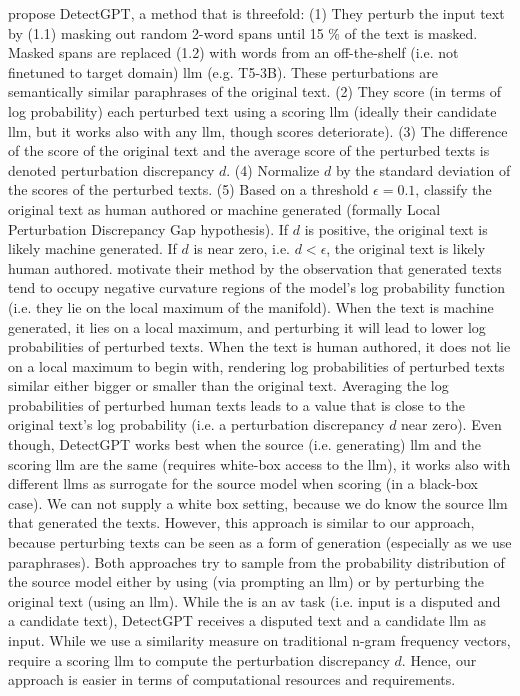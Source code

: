 \citet{mitchell_detectgpt_2023} propose DetectGPT, a method that is threefold:
(1) They perturb the input text by (1.1) masking out random 2-word spans until 15 \% of the text is masked. 
Masked spans are replaced (1.2) with words from an off-the-shelf (i.e. not finetuned to target domain) \ac{llm} (e.g. T5-3B). 
These perturbations are semantically similar paraphrases of the original text.
(2) They score (in terms of log probability) each perturbed text using a scoring \ac{llm} 
(ideally their candidate \ac{llm}, but it works also with any \ac{llm}, though scores deteriorate). 
(3) The difference of the score of the original text and the average score of the perturbed texts is denoted perturbation discrepancy $d$. 
(4) Normalize $d$ by the standard deviation of the scores of the perturbed texts.
(5) Based on a threshold $\epsilon=0.1$, classify the original text as human authored or machine generated 
(formally Local Perturbation Discrepancy Gap hypothesis).
If $d$ is positive, the original text is likely machine generated.
If $d$ is near zero, i.e. $d < \epsilon$, the original text is likely human authored.
\citet{mitchell_detectgpt_2023} motivate their method by the observation that generated texts tend to occupy 
negative curvature regions of the model's log probability function (i.e. they lie on the local maximum of the manifold).
When the text is machine generated, it lies on a local maximum, 
and perturbing it will lead to lower log probabilities of perturbed texts.
When the text is human authored, it does not lie on a local maximum to begin with, 
rendering log probabilities of perturbed texts similar either bigger or smaller than the original text.
Averaging the log probabilities of perturbed human texts leads to a value that is 
close to the original text's log probability (i.e. a perturbation discrepancy $d$ near zero).
Even though, DetectGPT works best when the source (i.e. generating) \ac{llm} and the scoring \ac{llm} are the same 
(requires white-box access to the \ac{llm}), 
it works also with different \acp{llm} as surrogate for the source model when scoring (in a black-box case).
We can not supply a white box setting, because we do know the source \ac{llm} that generated the \imp{} texts.
However, this approach is similar to our approach, because perturbing texts can be seen as a 
form of \imp{} generation (especially as we use paraphrases). 
Both approaches try to sample from the probability distribution of the source model either 
by using \imps{} (via prompting an \ac{llm}) or by perturbing the original text (using an \ac{llm}).
While the \impAppr{} is an \ac{av} task (i.e. input is a disputed and a candidate text), 
DetectGPT receives a disputed text and a candidate \ac{llm} as input.
While we use a similarity measure on traditional n-gram frequency vectors, 
\citet{mitchell_detectgpt_2023} require a scoring \ac{llm} to compute the perturbation discrepancy $d$.
Hence, our approach is easier in terms of computational resources and requirements.

